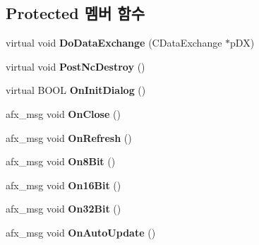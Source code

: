 \subsection*{Protected 멤버 함수}
\begin{DoxyCompactItemize}
\item 
\mbox{\label{class_memory_viewer_dlg_aeee7f9087554df8563689ab22facbbd6}} 
virtual void {\bfseries Do\+Data\+Exchange} (C\+Data\+Exchange $\ast$p\+DX)
\item 
\mbox{\label{class_memory_viewer_dlg_a3dd16d8770e7b5d3e174c9630ca4ecb8}} 
virtual void {\bfseries Post\+Nc\+Destroy} ()
\item 
\mbox{\label{class_memory_viewer_dlg_a2061415e67d04b0c157ba2bd50a8c56c}} 
virtual B\+O\+OL {\bfseries On\+Init\+Dialog} ()
\item 
\mbox{\label{class_memory_viewer_dlg_a49522f159a0ccbca8c511e5c248b9b93}} 
afx\+\_\+msg void {\bfseries On\+Close} ()
\item 
\mbox{\label{class_memory_viewer_dlg_a2c10fa49648424e4994c8c5a71f4effc}} 
afx\+\_\+msg void {\bfseries On\+Refresh} ()
\item 
\mbox{\label{class_memory_viewer_dlg_ad408c6c194db416a0cf23480184ef610}} 
afx\+\_\+msg void {\bfseries On8\+Bit} ()
\item 
\mbox{\label{class_memory_viewer_dlg_a61f6aec84a4bcf908dc32f9e85c871d0}} 
afx\+\_\+msg void {\bfseries On16\+Bit} ()
\item 
\mbox{\label{class_memory_viewer_dlg_afb8178dcad55d86c9217f89e0ed4814f}} 
afx\+\_\+msg void {\bfseries On32\+Bit} ()
\item 
\mbox{\label{class_memory_viewer_dlg_abd1a90d5974c83a3b388043d6162f118}} 
afx\+\_\+msg void {\bfseries On\+Auto\+Update} ()
\item 
\mbox{\label{class_memory_viewer_dlg_aa21f28b3490b179e79e3a3687fef0c45}} 

\end{DoxyCompactItemize}
